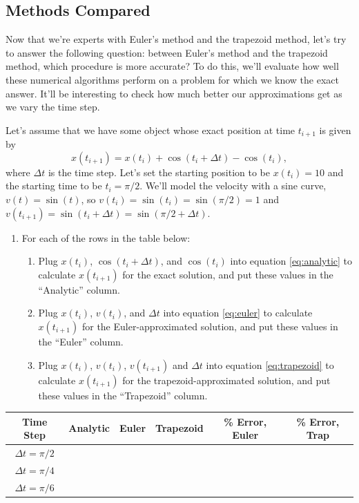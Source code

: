 \documentclass[11pt]{article}
\begin{document}
\subsection{Methods Compared}
Now that we're experts with Euler's method and the trapezoid method, let's try to answer the following question: between Euler's method and the trapezoid method, which procedure is more accurate? To do this, we'll evaluate how well these numerical algorithms perform on a problem for which we know the exact answer. It'll be interesting to check how much better our approximations get as we vary the time step. \vspace{\baselineskip}

\noindent
Let's assume that we have some object whose exact position at time $t_{i+1}$ is given by
\begin{equation} \label{eq:analytic}
\boxed{x(t_{i+1}) = x(t_i) + \cos(t_i + \Delta t) - \cos(t_i)},
\end{equation}
where $\Delta t$ is the time step.
Let's set the starting position to be $x(t_i) = 10$ and the starting time to be $t_i = \pi / 2$. We'll model the velocity with a sine curve, $v(t) = \sin(t)$, so $v(t_i) = \sin(t_i) = \sin(\pi/2) = 1$ and $v(t_{i+1}) = \sin(t_i + \Delta t) = \sin(\pi/2 + \Delta t)$. \vspace{\baselineskip}

\noindent
\begin{enumerate}[resume]
    \item For each of the rows in the table below:
    \begin{enumerate}
        \item Plug $x(t_i)$, $\cos(t_i + \Delta t)$, and $\cos(t_i)$ into equation \ref{eq:analytic} to calculate $x(t_{i+1})$ for the exact solution, and put these values in the ``Analytic'' column.
        \item Plug $x(t_i)$, $v(t_i)$, and $\Delta t$ into equation \ref{eq:euler} to calculate $x(t_{i+1})$ for the Euler-approximated solution, and put these values in the ``Euler'' column.
        \item Plug $x(t_i)$, $v(t_i)$, $v(t_{i+1})$ and $\Delta t$ into equation \ref{eq:trapezoid} to calculate $x(t_{i+1})$ for the trapezoid-approximated solution, and put these values in the ``Trapezoid'' column.
    \end{enumerate}
\end{enumerate}

\vspace{10 pt}
\begin{tabular}{c|c|c|c|c|c}
		Time Step & Analytic & Euler & Trapezoid & \% Error, Euler & \% Error, Trap  \\
\hline
\hline
$\Delta t = \pi/2$ & & & & & \\
\hline
$\Delta t = \pi/4$ & & & & & \\
\hline
$\Delta t = \pi/6$ & & & & & \\
\end{tabular}
\vspace{\baselineskip}
\end{document}
